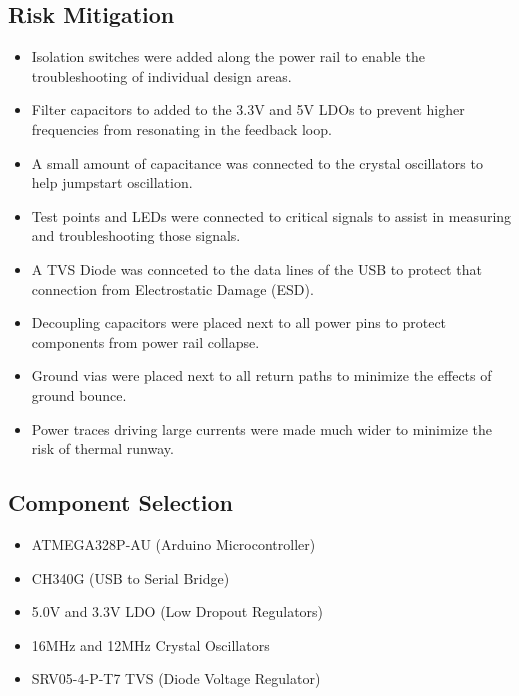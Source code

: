 \documentclass{article}
\begin{document}
\subsection{Risk Mitigation}
\begin{itemize}
    \setlength\itemsep{-2mm}
    \item Isolation switches were added along the power rail to enable the troubleshooting of individual design areas.
    \item Filter capacitors to added to the 3.3V and 5V LDOs to prevent higher frequencies from resonating in the feedback loop.
    \item A small amount of capacitance was connected to the crystal oscillators to help jumpstart oscillation.
    \item Test points and LEDs were connected to critical signals to assist in measuring and troubleshooting those signals.
    \item A TVS Diode was connceted to the data lines of the USB to protect that connection from Electrostatic Damage (ESD).
    \item Decoupling capacitors were placed next to all power pins to protect components from power rail collapse.
    \item Ground vias were placed next to all return paths to minimize the effects of ground bounce.
    \item Power traces driving large currents were made much wider to minimize the risk of thermal runway.
\end{itemize}
\subsection{Component Selection}
\begin{itemize}
    \setlength\itemsep{-2mm}
    \item ATMEGA328P-AU (Arduino Microcontroller)
    \item CH340G (USB to Serial Bridge)
    \item 5.0V and 3.3V LDO (Low Dropout Regulators)
    \item 16MHz and 12MHz Crystal Oscillators
    \item SRV05-4-P-T7 TVS (Diode Voltage Regulator)
\end{itemize}

\end{document}
